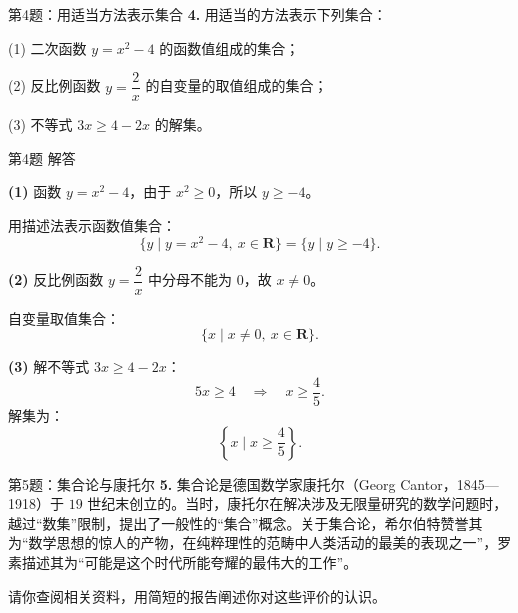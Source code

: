 \documentclass[10pt,aspectratio=169,serif]{beamer}
\begin{document}
\begin{frame}[t]{第4题：用适当方法表示集合}
\textbf{4.} 用适当的方法表示下列集合：

\vspace{0.5em}
(1) 二次函数 $y = x^2 - 4$ 的函数值组成的集合；

\vspace{0.5em}
(2) 反比例函数 $y = \dfrac{2}{x}$ 的自变量的取值组成的集合；

\vspace{0.5em}
(3) 不等式 $3x \ge 4 - 2x$ 的解集。
\end{frame}

\begin{frame}[t]{第4题 解答}
\begin{tcolorbox}[colback=orange!10,colframe=orange,title=\textbf{解}]
\textbf{(1)} 函数 $y = x^2 - 4$，由于 $x^2 \ge 0$，所以 $y \ge -4$。

用描述法表示函数值集合：
\[
\{y \mid y = x^2 - 4,\ x \in \mathbf{R}\} = \{y \mid y \ge -4\}.
\]

\vspace{0.5em}
\textbf{(2)} 反比例函数 $y = \dfrac{2}{x}$ 中分母不能为 $0$，故 $x \ne 0$。

自变量取值集合：
\[
\{x \mid x \ne 0,\ x \in \mathbf{R}\}.
\]

\vspace{0.5em}
\textbf{(3)} 解不等式 $3x \ge 4 - 2x$：
\[
5x \ge 4 \quad\Rightarrow\quad x \ge \frac{4}{5}.
\]
解集为：
\[
\left\{x \mid x \ge \frac{4}{5}\right\}.
\]
\end{tcolorbox}
\end{frame}

\begin{frame}[t]{第5题：集合论与康托尔}
\textbf{5.} 集合论是德国数学家康托尔（Georg Cantor，1845—1918）于 $19$ 世纪末创立的。当时，康托尔在解决涉及无限量研究的数学问题时，越过“数集”限制，提出了一般性的“集合”概念。关于集合论，希尔伯特赞誉其为“数学思想的惊人的产物，在纯粹理性的范畴中人类活动的最美的表现之一”，罗素描述其为“可能是这个时代所能夸耀的最伟大的工作”。

\vspace{0.5em}
\alert{请你查阅相关资料，用简短的报告阐述你对这些评价的认识。}
\end{frame}
\end{document}
